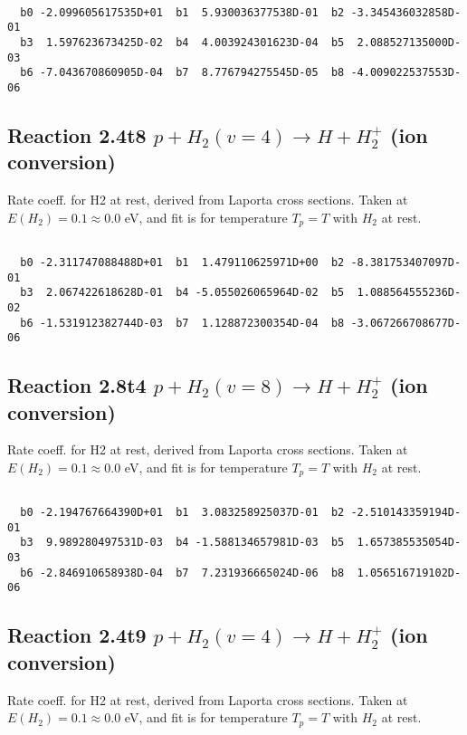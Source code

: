 \begin{small}\begin{verbatim}

  b0 -2.099605617535D+01  b1  5.930036377538D-01  b2 -3.345436032858D-01
  b3  1.597623673425D-02  b4  4.003924301623D-04  b5  2.088527135000D-03
  b6 -7.043670860905D-04  b7  8.776794275545D-05  b8 -4.009022537553D-06

\end{verbatim}\end{small}

\newpage
\subsection{
Reaction 2.4t8
$ p + H_2(v=4) \rightarrow H + H_2^+$ (ion conversion)
}
Rate coeff. for H2 at rest, derived from Laporta cross sections.
Taken at $E(H_2) = 0.1 \approx 0.0$ eV,  and fit is for temperature $T_p=T$ with $H_2$ at rest.

\begin{small}\begin{verbatim}

  b0 -2.311747088488D+01  b1  1.479110625971D+00  b2 -8.381753407097D-01
  b3  2.067422618628D-01  b4 -5.055026065964D-02  b5  1.088564555236D-02
  b6 -1.531912382744D-03  b7  1.128872300354D-04  b8 -3.067266708677D-06

\end{verbatim}\end{small}

\newpage
\subsection{
Reaction 2.8t4
$ p + H_2(v=8) \rightarrow H + H_2^+$ (ion conversion)
}
Rate coeff. for H2 at rest, derived from Laporta cross sections.
Taken at $E(H_2) = 0.1 \approx 0.0$ eV,  and fit is for temperature $T_p=T$ with $H_2$ at rest.

\begin{small}\begin{verbatim}

  b0 -2.194767664390D+01  b1  3.083258925037D-01  b2 -2.510143359194D-01
  b3  9.989280497531D-03  b4 -1.588134657981D-03  b5  1.657385535054D-03
  b6 -2.846910658938D-04  b7  7.231936665024D-06  b8  1.056516719102D-06

\end{verbatim}\end{small}

\newpage
\subsection{
Reaction 2.4t9
$ p + H_2(v=4) \rightarrow H + H_2^+$ (ion conversion)
}
Rate coeff. for H2 at rest, derived from Laporta cross sections.
Taken at $E(H_2) = 0.1 \approx 0.0$ eV,  and fit is for temperature $T_p=T$ with $H_2$ at rest.

